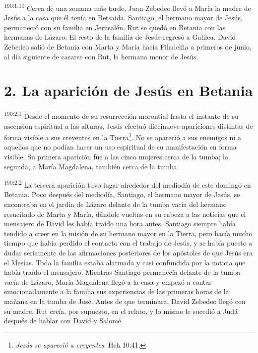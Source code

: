 \par 
\textsuperscript{190:1.10} Cerca de una semana más tarde, Juan Zebedeo llevó a María la madre de Jesús a la casa que él tenía en Betsaida. Santiago, el hermano mayor de Jesús, permaneció con su familia en Jerusalén. Rut se quedó en Betania con las hermanas de Lázaro. El resto de la familia de Jesús regresó a Galilea. David Zebedeo salió de Betania con Marta y María hacia Filadelfia a primeros de junio, al día siguiente de casarse con Rut, la hermana menor de Jesús.

\section*{2. La aparición de Jesús en Betania}
\par 
\textsuperscript{190:2.1} Desde el momento de su resurrección morontial hasta el instante de su ascensión espiritual a las alturas, Jesús efectuó diecinueve apariciones distintas de forma visible a sus creyentes en la Tierra\footnote{\textit{Jesús se apareció a creyentes}: Hch 10:41.}. No se apareció a sus enemigos ni a aquellos que no podían hacer un uso espiritual de su manifestación en forma visible. Su primera aparición fue a las cinco mujeres cerca de la tumba; la segunda, a María Magdalena, también cerca de la tumba.

\par 
\textsuperscript{190:2.2} La tercera aparición tuvo lugar alrededor del mediodía de este domingo en Betania. Poco después del mediodía, Santiago, el hermano mayor de Jesús, se encontraba en el jardín de Lázaro delante de la tumba vacía del hermano resucitado de Marta y María, dándole vueltas en su cabeza a las noticias que el mensajero de David les había traído una hora antes. Santiago siempre había tendido a creer en la misión de su hermano mayor en la Tierra, pero hacía mucho tiempo que había perdido el contacto con el trabajo de Jesús, y se había puesto a dudar seriamente de las afirmaciones posteriores de los apóstoles de que Jesús era el Mesías. Toda la familia estaba alarmada y casi confundida por la noticia que había traído el mensajero. Mientras Santiago permanecía delante de la tumba vacía de Lázaro, María Magdalena llegó a la casa y empezó a contar emocionadamente a la familia sus experiencias de las primeras horas de la mañana en la tumba de José. Antes de que terminara, David Zebedeo llegó con su madre. Rut creía, por supuesto, en el relato, y lo mismo le sucedió a Judá después de hablar con David y Salomé.

